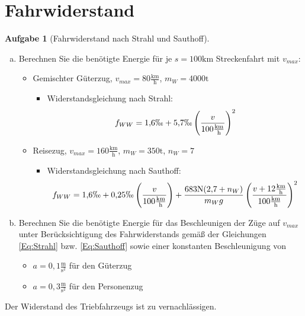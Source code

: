 \documentclass[10pt,a4paper,headsepline,smallheadings]{scrartcl}
\theoremstyle{definition}
\newtheorem{aufgabe}{Aufgabe}
\begin{document}
\section*{Fahrwiderstand}
\begin{aufgabe}[Fahrwiderstand nach Strahl und Sauthoff]
\begin{enumerate}[a)]
\item Berechnen Sie die ben\"otigte Energie f\"ur je $s = 100 \mathrm{km}$ Streckenfahrt mit $v_{max}$:
\begin{itemize}
		\item Gemischter G\"uterzug, $v_{max} = 80 \frac{\mathrm{km}}{\mathrm{h}}$, $m_{W} = 4000 \mathrm{t}$
		\begin{itemize}
		\item Widerstandsgleichung nach Strahl:
		\begin{equation}
		\label{Eq:Strahl}
			f_{WW} = 1{,}6 \permil +  5{,}7 \permil \left( \frac{v}{100 \frac{\mathrm{km}}{\mathrm{h}}} \right)^2
		\end{equation}
		\end{itemize}
		\item Reisezug, $v_{max} = 160 \frac{\mathrm{km}}{\mathrm{h}}$, $m_{W} = 350 \mathrm{t}$, $n_{W} = 7$
 		\begin{itemize}
		\item Widerstandsgleichung nach Sauthoff:
		\begin{equation}
		\label{Eq:Sauthoff}
			f_{WW} = 1{,}6 \permil + 0{,}25 \permil \left( \frac{v}{100 \frac{\mathrm{km}}{\mathrm{h}}} \right) + 
			\frac{683 \mathrm{N}(2{,}7 + n_{W}) }{m_{W} g} \left( \frac{v+ 12 \frac{\mathrm{km}}{\mathrm{h}}}{100 \frac{\mathrm{km}}{\mathrm{h}}} \right)^2
		\end{equation}
		\end{itemize}
		\end{itemize}
\item Berechnen Sie die ben\"otigte Energie f\"ur das Beschleunigen der Z\"uge auf $v_{max}$ unter Ber\"ucksichtigung des Fahrwiderstands gem\"a{\ss} der Gleichungen \eqref{Eq:Strahl} bzw. \eqref{Eq:Sauthoff} sowie einer konstanten Beschleunigung von
\begin{itemize}
		\item $a = 0{,}1 \frac{\mathrm{m}}{\mathrm{s}^2}$ f\"ur den G\"uterzug
		\item $a = 0{,}3 \frac{\mathrm{m}}{\mathrm{s}^2}$ f\"ur den Personenzug
		\end{itemize}
\end{enumerate}
Der Widerstand des Triebfahrzeugs ist zu vernachl\"assigen.
\end{aufgabe}

% 
\end{document}
